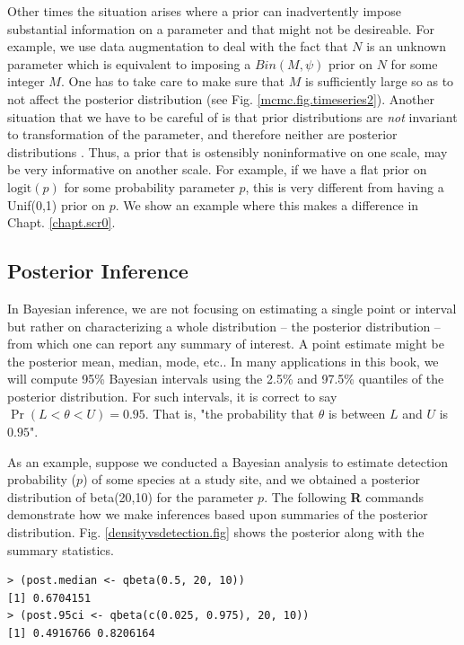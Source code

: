 Other times the situation arises where a prior can inadvertently impose
substantial information on a parameter and that might not be desireable.
For example, we use data augmentation
to deal with the fact that $N$ is an unknown parameter
 \citep{royle_etal:2007} which is equivalent to imposing a $Bin(M,\psi)$
 prior on $N$ for some integer $M$. One has to take care to make sure
 that $M$ is sufficiently large so as to not affect the posterior
 distribution (see Fig. \ref{mcmc.fig.timeseries2}).
Another situation that we have
 to be careful of is that
prior 
distributions are {\it not} invariant to transformation of the
parameter,
and therefore neither are posterior distributions
\citep[][sec. 6.2.1]{link_barker:2010}. Thus, a prior that is ostensibly
noninformative on one scale, may be very informative on another
scale. 
For example, if we have a flat prior on $\mbox{logit}(p)$ for some probability
parameter $p$, this is very different from having a 
\mbox{Unif}(0,1) prior 
on $p$. We show an example where this makes a difference in Chapt. \ref{chapt.scr0}.

\subsection{Posterior Inference}

In Bayesian inference, we are not focusing on estimating a single
point or interval but rather on characterizing a whole distribution --
the posterior distribution -- from which one can report any summary of
interest. A point estimate might be the posterior mean, median, mode,
etc..  In many applications in this book, we will compute 95\%
Bayesian intervals using the 2.5\% and 97.5\% quantiles of the
posterior distribution. For such intervals, it is correct to say
$\Pr(L < \theta < U) = 0.95$. That is, "the probability that $\theta$
is between $L$ and $U$ is $0.95$". 

As an
example, suppose we conducted a Bayesian analysis to estimate
detection probability ($p$) of some species at a study site, and we
obtained a posterior distribution of beta(20,10) for the parameter
$p$. The following {\bf R} commands demonstrate how we make inferences based
upon summaries of the posterior distribution. Fig. \ref{densityvsdetection.fig} shows the
posterior along with the summary statistics.

\begin{verbatim}
> (post.median <- qbeta(0.5, 20, 10))
[1] 0.6704151
> (post.95ci <- qbeta(c(0.025, 0.975), 20, 10))
[1] 0.4916766 0.8206164
\end{verbatim}

